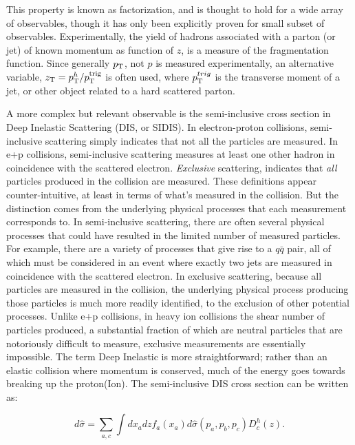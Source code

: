   This property is known as factorization, and is thought to hold for a wide array of observables, though it has only been explicitly proven for small subset of observables. Experimentally, the yield of hadrons associated with a parton (or jet) of known momentum as function of $z$, is a measure of the fragmentation function. Since generally $p_{\mathrm{T}}$, not  $p$ is measured experimentally, an alternative variable,  $z_{\mathrm{T}}=p_{\mathrm{T}}^h/p_{\mathrm{T}}^\mathrm{trig}$ is often used, where $p_{\mathrm{T}}^{trig}$ is the transverse moment of a jet, or other object related to a hard scattered parton. 

A more complex but relevant observable is the semi-inclusive cross section in Deep Inelastic Scattering (DIS, or SIDIS). In electron-proton collisions, semi-inclusive scattering simply indicates that not all the particles are measured. In e+p collisions, semi-inclusive scattering measures at least one other hadron in coincidence with the scattered electron. \textit{Exclusive} scattering, indicates that \textit{all} particles produced in the collision are measured. These definitions appear counter-intuitive, at least in terms of what's measured in the collision. But the distinction comes from the underlying physical processes that each measurement corresponds to. In semi-inclusive scattering, there are often several physical processes that could have resulted in the limited number of measured particles. For example, there are a variety of processes that give rise to a $q\bar{q}$ pair, all of which must be considered in an event where exactly two jets are measured in coincidence with the scattered electron. In exclusive scattering, because all particles are measured in the collision, the underlying physical process producing those particles is much  more readily identified, to the exclusion of other potential processes. Unlike e+p collisions, in heavy ion collisions the shear number of particles produced, a substantial fraction of which are neutral particles that are notoriously difficult to measure, exclusive measurements are essentially impossible. The term Deep Inelastic is more straightforward; rather than an elastic collision where momentum is conserved, much of the energy goes towards breaking up the proton(Ion). The semi-inclusive DIS cross section can be written as:

  \begin{equation}
    d\hat{\sigma}= \sum_{a,c} \int dx_a dz f_a(x_a) d\hat{\sigma}(p_a,p_b,p_c) D_c^h(z).
    \label{sidis_cross_section}
  \end{equation}

